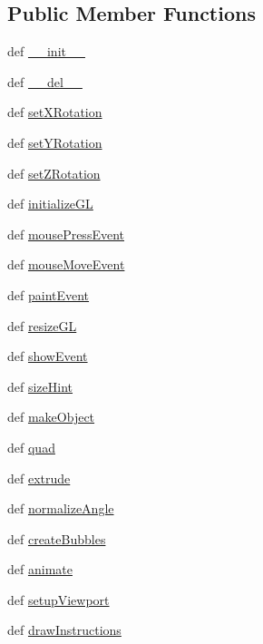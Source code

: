 \subsection*{Public Member Functions}
\begin{DoxyCompactItemize}
\item 
def \hyperlink{classoverpainting_1_1GLWidget_a399433f7f084cd5884864fce17a4b86f}{\+\_\+\+\_\+init\+\_\+\+\_\+}
\item 
def \hyperlink{classoverpainting_1_1GLWidget_adaf2628b18559af99992d7c440c5dafd}{\+\_\+\+\_\+del\+\_\+\+\_\+}
\item 
def \hyperlink{classoverpainting_1_1GLWidget_aad5a725eb70f0f4744ab044b2b6f0582}{set\+X\+Rotation}
\item 
def \hyperlink{classoverpainting_1_1GLWidget_a1dcf942ee51eccfdca94552e248471ce}{set\+Y\+Rotation}
\item 
def \hyperlink{classoverpainting_1_1GLWidget_a80621ce03b4fbbd6a7c5a6917728d3c4}{set\+Z\+Rotation}
\item 
def \hyperlink{classoverpainting_1_1GLWidget_a80178b37721445e749fb223090e4d8f8}{initialize\+G\+L}
\item 
def \hyperlink{classoverpainting_1_1GLWidget_aa0b7175003371b9647e8eff4bab64b75}{mouse\+Press\+Event}
\item 
def \hyperlink{classoverpainting_1_1GLWidget_a517cc6d3737f82d84cdbe716ab4fd84e}{mouse\+Move\+Event}
\item 
def \hyperlink{classoverpainting_1_1GLWidget_a72c1e4352be15342441c3a0c86330830}{paint\+Event}
\item 
def \hyperlink{classoverpainting_1_1GLWidget_a01203de99ce107c39369afa5318d61a5}{resize\+G\+L}
\item 
def \hyperlink{classoverpainting_1_1GLWidget_ab608cf0b8929b37314ecf3ee2041e24a}{show\+Event}
\item 
def \hyperlink{classoverpainting_1_1GLWidget_a059383cd1008fc90b9b83e4ee988a05a}{size\+Hint}
\item 
def \hyperlink{classoverpainting_1_1GLWidget_a8cd027e9c7b1ac41e440a1a33bb0ba1b}{make\+Object}
\item 
def \hyperlink{classoverpainting_1_1GLWidget_a94bcc55ada64bad3072987292c3ef85d}{quad}
\item 
def \hyperlink{classoverpainting_1_1GLWidget_ac6fd6fa16c1145b8368d499156a75c89}{extrude}
\item 
def \hyperlink{classoverpainting_1_1GLWidget_a61e95fb88f1f2e8a3da1498952a5a14f}{normalize\+Angle}
\item 
def \hyperlink{classoverpainting_1_1GLWidget_a3f89277c9189411300af73a9d82f3da8}{create\+Bubbles}
\item 
def \hyperlink{classoverpainting_1_1GLWidget_aa17492d09414b5be62f311e777e672cc}{animate}
\item 
def \hyperlink{classoverpainting_1_1GLWidget_a574339bec5dc076013e7300a38be96e3}{setup\+Viewport}
\item 
def \hyperlink{classoverpainting_1_1GLWidget_ae69daed74de881303abecafd60143fe0}{draw\+Instructions}
\end{DoxyCompactItemize}

